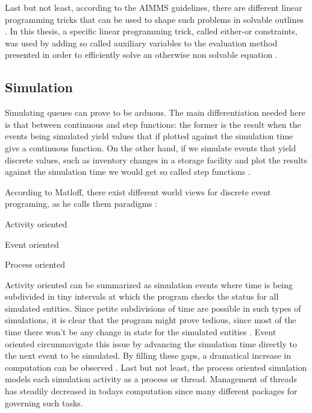 \documentclass{seal_thesis}
\begin{document}
Last but not least, according to the AIMMS guidelines, there are different linear programming tricks that can be used to shape such problems in solvable outlines \cite{Bisschop2016}. In this thesis, a specific linear programming trick, called either-or constraints, was used by adding so called auxiliary variables to the evaluation method presented in order to efficiently solve an otherwise non solvable equation \cite[p. 77]{Bisschop2016}.

\subsection{Simulation}

Simulating queues can prove to be arduous. The main differentiation needed here is that between continuous and step functions: the former is the result when the events being simulated yield values that if plotted against the simulation time give a continuous function. On the other hand, if we simulate events that yield discrete values, such as inventory changes in a storage facility and plot the results against the simulation time we would get so called step functions \cite{Matloff2008}.

According to Matloff, there exist different world views for discrete event programing, as he calls them paradigms \cite{Matloff2008}:
\begin{enumerate*}
	\item Activity oriented
	\item Event oriented
	\item Process oriented
\end{enumerate*}

Activity oriented can be summarized as simulation events where time is being subdivided in tiny intervals at which the program checks the status for all simulated entities. Since petite subdivisions of time are possible in such types of simulations, it is clear that the program might prove tedious, since most of the time there won't be any change in state for the simulated entities \cite{Matloff2008}. Event oriented circumnavigate this issue by advancing the simulation time directly to the next event to be simulated. By filling these gaps, a dramatical increase in computation can be observed \cite{Matloff2008}. Last but not least, the process oriented simulation models each simulation activity as a process or thread. Management of threads has steadily decreased in todays computation since many different packages for governing such tasks.
\end{document}

